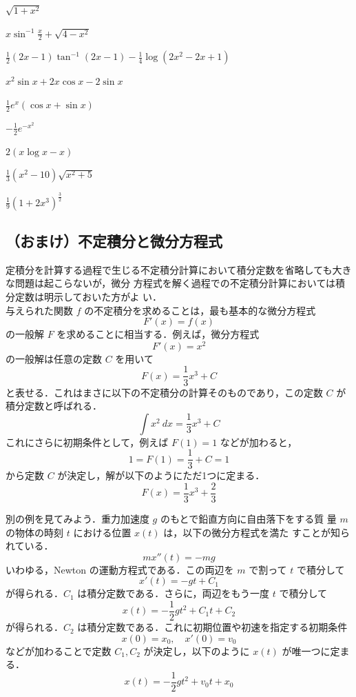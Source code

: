 \documentclass[10pt, uplatex, dvipdfmx]{jsarticle}
\theoremstyle{definition}
\numberwithin{equation}{section}
\newcommand{\ds}{\displaystyle}
\begin{document}
\begin{edaenumerate}
\item $\ds \sqrt{1+x^2}$

\item $\ds x\sin^{-1}\frac{x}{2} + \sqrt{4-x^2}$

\item<1> $\ds \frac{1}{2}\left(2x-1\right)\tan^{-1}\left(2x-1\right)-\frac{1}{4}\log \left(2x^2-2x+1\right)$ 

\item<2> $\ds x^2\sin x + 2x\cos x - 2 \sin x$

\item $\ds \frac{1}{2}e^x\left( \cos x + \sin x\right)$

\item $\ds -\frac{1}{2}e^{-x^2}$

\item $\ds 2 \left( x \log x - x\right)$

\item $\ds \frac{1}{3}\left(x^2-10 \right)\sqrt{x^2+5}$

\item $\ds \frac{1}{9} \left(1+2x^3\right)^{\frac{3}{2}}$

\end{edaenumerate}

\newpage

\subsection{（おまけ）不定積分と微分方程式}

定積分を計算する過程で生じる不定積分計算において積分定数を省略しても大きな問題は起こらないが，微分
方程式を解く過程での不定積分計算においては積分定数は明示しておいた方がよ
い．\\

与えられた関数 $f$ の不定積分を求めることは，最も基本的な微分方程式
\[
  F'(x) = f(x)
\]
の一般解 $F$ を求めることに相当する．例えば，微分方程式
\[
  F'(x) = x^2
\]
の一般解は任意の定数 $C$ を用いて
\[
  F(x) = \frac{1}{3}x^3 + C 
\]
と表せる．これはまさに以下の不定積分の計算そのものであり，この定数 $C$ が積分定数と呼ばれる．
\[
  \int x^2 \ dx = \frac{1}{3} x^3 +C
\]
これにさらに初期条件として，例えば $F(1) = 1$ などが加わると，
\[
  1=F(1) = \frac{1}{3}+C= 1
\]
から定数 $C$ が決定し，解が以下のようにただ1つに定まる．
\[
  F(x) = \frac{1}{3}x^3 + \frac{2}{3}
\]

\vspace{2zh}

別の例を見てみよう．重力加速度 $g$ のもとで鉛直方向に自由落下をする質
量 $m$ の物体の時刻 $t$ における位置 $x(t)$ は，以下の微分方程式を満た
すことが知られている．
\[
  mx''(t) = -mg
\]
いわゆる，Newton の運動方程式である．この両辺を $m$ で割って $t$ で積分して
\[
  x'(t) = -g t +C_1
\]
が得られる．$C_1$ は積分定数である．さらに，両辺をもう一度 $t$ で積分して
\[
  x(t) = -\frac{1}{2}g t^2 + C_1 t + C_2
\]
が得られる．$C_2$ は積分定数である．これに初期位置や初速を指定する初期条件
\[
  x(0) = x_0, \quad x'(0)= v_0
\]
などが加わることで定数 $C_1, C_2$ が決定し，以下のように $x(t)$ が唯一つに定まる．
\[
  x(t) = -\frac{1}{2}g t^2 + v_0 t + x_0
\]
\end{document}
